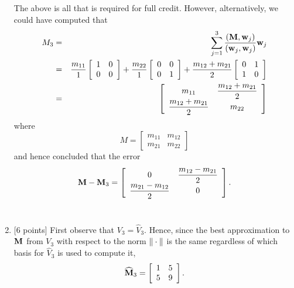 \begin{solution}
\begin{enumerate}
The above is all that is required for full credit. However, alternatively, we could have computed that
\begin{eqnarray*}
M_3&=&\displaystyle{\sum_{j=1}^3{({\bf M},{\bf w}_j) \over ({\bf w}_j,{\bf w}_j)}{\bf w}_j}
\\
&=&\displaystyle{{m_{11} \over 1}\left[\begin{array}{cc}1 & 0 \\ 0 & 0\end{array}\right]+{m_{22} \over 1}\left[\begin{array}{cc}0 & 0 \\ 0 & 1\end{array}\right]+{m_{12}+m_{21} \over 2}\left[\begin{array}{cc}0 & 1 \\ 1 & 0\end{array}\right]}
\\
&=&\left[\begin{array}{cc} \displaystyle{m_{11}} & \displaystyle{\frac{m_{12}+m_{21}}{2}} \\ \displaystyle{\frac{m_{12}+m_{21}}{2}} & \displaystyle{m_{22}}\end{array}\right]
\end{eqnarray*}
 where
\[
M=\left[\begin{array}{cc} m_{11} & m_{12} \\ m_{21} & m_{22}\end{array}\right]
\]
and hence concluded that the error
\[
{\bf M}-{\bf M}_3=\left[\begin{array}{cc} \displaystyle{0} & \displaystyle{\frac{m_{12}-m_{21}}{2}} \\ \displaystyle{\frac{m_{21}-m_{12}}{2}} & \displaystyle{0}\end{array}\right].
\]
\\
\item {[6 points]} First observe that $V_3=\widehat{V}_3$. Hence, since the best approximation to ${\bf M}$ from $V_3$ with respect to the norm $\|\cdot\|$ is the same regardless of which basis for $\widehat{V}_3$ is used to compute it,
\[
\widehat{{\bf M}}_3=\left[\begin{array}{cc}1 & 5 \\ 5 & 9\end{array}\right].
\]


\end{enumerate}
\end{solution}
